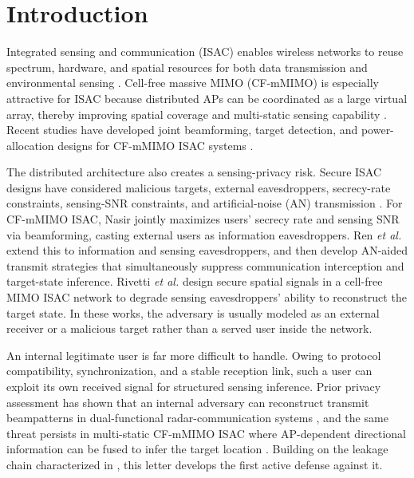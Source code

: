 \documentclass[lettersize,journal]{IEEEtran}
\begin{document}
\section{Introduction}
Integrated sensing and communication (ISAC) enables wireless networks to reuse spectrum, hardware, and spatial resources for both data transmission and environmental sensing \cite{wei2022multifunctional}. Cell-free massive MIMO (CF-mMIMO) is especially attractive for ISAC because distributed APs can be coordinated as a large virtual array, thereby improving spatial coverage and multi-static sensing capability \cite{ngo2017cellfree}. Recent studies have developed joint beamforming, target detection, and power-allocation designs for CF-mMIMO ISAC systems \cite{demirhan2024cellfreetcom,behdad2024multistatic}.

The distributed architecture also creates a sensing-privacy risk. Secure ISAC designs have considered malicious targets, external eavesdroppers, secrecy-rate constraints, sensing-SNR constraints, and artificial-noise (AN) transmission \cite{art:su2021,ren2023robust,zou2024securing}. For CF-mMIMO ISAC, Nasir \cite{nasir2024joint} jointly maximizes users' secrecy rate and sensing SNR via beamforming, casting external users as information eavesdroppers. Ren \emph{et al.} \cite{ren2023securecf} extend this to information and sensing eavesdroppers, and then develop AN-aided transmit strategies that simultaneously suppress communication interception and target-state inference. Rivetti \emph{et al.} \cite{rivetti2024secure} design secure spatial signals in a cell-free MIMO ISAC network to degrade sensing eavesdroppers' ability to reconstruct the target state. In these works, the adversary is usually modeled as an external receiver or a malicious target rather than a served user inside the network.

An internal legitimate user is far more difficult to handle. Owing to protocol compatibility, synchronization, and a stable reception link, such a user can exploit its own received signal for structured sensing inference. Prior privacy assessment has shown that an internal adversary can reconstruct transmit beampatterns in dual-functional radar-communication systems \cite{dasilva2023privacy}, and the same threat persists in multi-static CF-mMIMO ISAC where AP-dependent directional information can be fused to infer the target location \cite{dasilva2023multistaticcf}. Building on the leakage chain characterized in \cite{dasilva2023multistaticcf}, this letter develops the first active defense against it.
\end{document}
